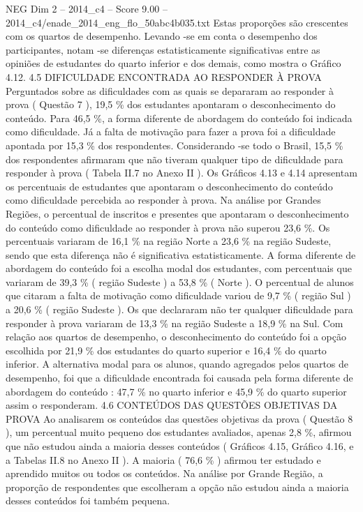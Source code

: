 \begin{textsample}{NEG Dim 2 – 2014\_c4 – Score 9.00 – 2014\_c4/enade\_2014\_eng\_flo\_50abc4b035.txt}
Estas proporções são crescentes com os quartos de desempenho.
Levando -se em conta o desempenho dos participantes, notam -se diferenças estatisticamente significativas entre as opiniões de estudantes do quarto inferior e dos demais, como mostra o Gráfico 4.12. 4.5 DIFICULDADE ENCONTRADA AO RESPONDER À PROVA Perguntados sobre as dificuldades com as quais se depararam ao responder à prova ( Questão 7 ), 19,5 \% dos estudantes apontaram o desconhecimento do conteúdo.
Para 46,5 \%, a forma diferente de abordagem do conteúdo foi indicada como dificuldade.
Já a falta de motivação para fazer a prova foi a dificuldade apontada por 15,3 \% dos respondentes.
Considerando -se todo o Brasil, 15,5 \% dos respondentes afirmaram que não tiveram qualquer tipo de dificuldade para responder à prova ( Tabela II.7 no Anexo II ).
Os Gráficos 4.13 e 4.14 apresentam os percentuais de estudantes que apontaram o desconhecimento do conteúdo como dificuldade percebida ao responder à prova.
Na análise por Grandes Regiões, o percentual de inscritos e presentes que apontaram o desconhecimento do conteúdo como dificuldade ao responder à prova não superou 23,6 \%.
Os percentuais variaram de 16,1 \% na região Norte a 23,6 \% na região Sudeste, sendo que esta diferença não é significativa estatisticamente.
A forma diferente de abordagem do conteúdo foi a escolha modal dos estudantes, com percentuais que variaram de 39,3 \% ( região Sudeste ) a 53,8 \% ( Norte ).
O percentual de alunos que citaram a falta de motivação como dificuldade variou de 9,7 \% ( região Sul ) a 20,6 \% ( região Sudeste ).
Os que declararam não ter qualquer dificuldade para responder à prova variaram de 13,3 \% na região Sudeste a 18,9 \% na Sul.
Com relação aos quartos de desempenho, o desconhecimento do conteúdo foi a opção escolhida por 21,9 \% dos estudantes do quarto superior e 16,4 \% do quarto inferior.
A alternativa modal para os alunos, quando agregados pelos quartos de desempenho, foi que a dificuldade encontrada foi causada pela forma diferente de abordagem do conteúdo : 47,7 \% no quarto inferior e 45,9 \% do quarto superior assim o responderam. 4.6 CONTEÚDOS DAS QUESTÕES OBJETIVAS DA PROVA Ao analisarem os conteúdos das questões objetivas da prova ( Questão 8 ), um percentual muito pequeno dos estudantes avaliados, apenas 2,8 \%, afirmou que não estudou ainda a maioria desses conteúdos ( Gráficos 4.15, Gráfico 4.16, e a Tabelas II.8 no Anexo II ).
A maioria ( 76,6 \% ) afirmou ter estudado e aprendido muitos ou todos os conteúdos.
Na análise por Grande Região, a proporção de respondentes que escolheram a opção não estudou ainda a maioria desses conteúdos foi também pequena.

\end{textsample}
